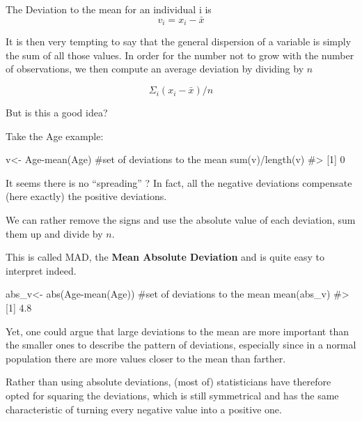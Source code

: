\documentclass[
  letterpaper,
  DIV=11,
  numbers=noendperiod]{scrreprt}
\newenvironment{Shaded}{\begin{snugshade}}{\end{snugshade}}
\newcommand{\CommentTok}[1]{\textcolor[rgb]{0.37,0.37,0.37}{#1}}
\newcommand{\FunctionTok}[1]{\textcolor[rgb]{0.28,0.35,0.67}{#1}}
\newcommand{\NormalTok}[1]{\textcolor[rgb]{0.00,0.23,0.31}{#1}}
\newcommand{\OtherTok}[1]{\textcolor[rgb]{0.00,0.23,0.31}{#1}}
\newcommand{\SpecialCharTok}[1]{\textcolor[rgb]{0.37,0.37,0.37}{#1}}
\begin{document}
The Deviation to the mean for an individual i is \[v_i=x_i-\bar{x}\]

It is then very tempting to say that the general dispersion of a
variable is simply the sum of all those values. In order for the number
not to grow with the number of observations, we then compute an average
deviation by dividing by \(n\)

\[\Sigma_i(x_i-\bar{x})/n\]

But is this a good idea?

Take the Age example:

\begin{Shaded}
\begin{Highlighting}[]
\NormalTok{v}\OtherTok{\textless{}{-}}\NormalTok{ Age}\SpecialCharTok{{-}}\FunctionTok{mean}\NormalTok{(Age) }\CommentTok{\#set of deviations to the mean}
\FunctionTok{sum}\NormalTok{(v)}\SpecialCharTok{/}\FunctionTok{length}\NormalTok{(v)}
\CommentTok{\#\textgreater{} [1] 0}
\end{Highlighting}
\end{Shaded}

It seems there is no ``spreading'' ? In fact, all the negative
deviations compensate (here exactly) the positive deviations.

We can rather remove the signs and use the absolute value of each
deviation, sum them up and divide by \(n\).

This is called MAD, the \textbf{Mean Absolute Deviation} and is quite
easy to interpret indeed.

\begin{Shaded}
\begin{Highlighting}[]
\NormalTok{abs\_v}\OtherTok{\textless{}{-}} \FunctionTok{abs}\NormalTok{(Age}\SpecialCharTok{{-}}\FunctionTok{mean}\NormalTok{(Age)) }\CommentTok{\#set of deviations to the mean}
\FunctionTok{mean}\NormalTok{(abs\_v)}
\CommentTok{\#\textgreater{} [1] 4.8}
\end{Highlighting}
\end{Shaded}

Yet, one could argue that large deviations to the mean are more
important than the smaller ones to describe the pattern of deviations,
especially since in a normal population there are more values closer to
the mean than farther.

Rather than using absolute deviations, (most of) statisticians have
therefore opted for squaring the deviations, which is still symmetrical
and has the same characteristic of turning every negative value into a
positive one.
\end{document}
